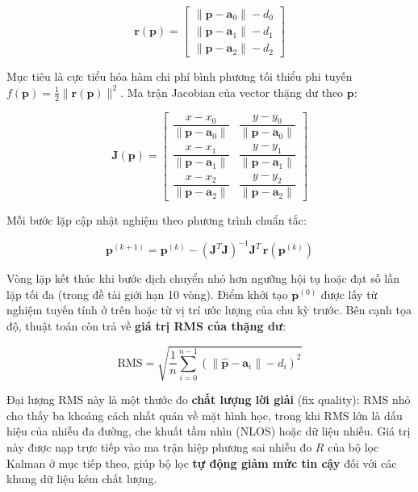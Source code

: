 \begin{equation}
    \mathbf{r}(\mathbf{p}) =
    \begin{bmatrix}
        \lVert \mathbf{p} - \mathbf{a}_0 \rVert - d_0 \\
        \lVert \mathbf{p} - \mathbf{a}_1 \rVert - d_1 \\
        \lVert \mathbf{p} - \mathbf{a}_2 \rVert - d_2
    \end{bmatrix}
\end{equation}

Mục tiêu là cực tiểu hóa hàm chi phí bình phương tối thiểu phi tuyến $f(\mathbf{p}) = \tfrac{1}{2} \lVert \mathbf{r}(\mathbf{p}) \rVert^2$. Ma trận Jacobian của vector thặng dư theo $\mathbf{p}$:

\begin{equation}
    \mathbf{J}(\mathbf{p}) =
    \begin{bmatrix}
        \dfrac{x - x_0}{\lVert \mathbf{p} - \mathbf{a}_0 \rVert} & \dfrac{y - y_0}{\lVert \mathbf{p} - \mathbf{a}_0 \rVert} \\[1.2em]
        \dfrac{x - x_1}{\lVert \mathbf{p} - \mathbf{a}_1 \rVert} & \dfrac{y - y_1}{\lVert \mathbf{p} - \mathbf{a}_1 \rVert} \\[1.2em]
        \dfrac{x - x_2}{\lVert \mathbf{p} - \mathbf{a}_2 \rVert} & \dfrac{y - y_2}{\lVert \mathbf{p} - \mathbf{a}_2 \rVert}
    \end{bmatrix}
\end{equation}

Mỗi bước lặp cập nhật nghiệm theo phương trình chuẩn tắc:

\begin{equation}
    \mathbf{p}^{(k+1)} = \mathbf{p}^{(k)} - \left(\mathbf{J}^T \mathbf{J}\right)^{-1} \mathbf{J}^T\, \mathbf{r}(\mathbf{p}^{(k)})
\end{equation}

Vòng lặp kết thúc khi bước dịch chuyển nhỏ hơn ngưỡng hội tụ hoặc đạt số lần lặp tối đa (trong đề tài giới hạn 10 vòng). Điểm khởi tạo $\mathbf{p}^{(0)}$ được lấy từ nghiệm tuyến tính ở trên hoặc từ vị trí ước lượng của chu kỳ trước. Bên cạnh tọa độ, thuật toán còn trả về \textbf{giá trị RMS của thặng dư}:

\begin{equation}
    \text{RMS} = \sqrt{\frac{1}{n}\sum_{i=0}^{n-1} \left(\lVert \hat{\mathbf{p}} - \mathbf{a}_i \rVert - d_i\right)^2}
\end{equation}

Đại lượng RMS này là một thước đo \textbf{chất lượng lời giải} (fix quality): RMS nhỏ cho thấy ba khoảng cách nhất quán về mặt hình học, trong khi RMS lớn là dấu hiệu của nhiễu đa đường, che khuất tầm nhìn (NLOS) hoặc dữ liệu nhiễu. Giá trị này được nạp trực tiếp vào ma trận hiệp phương sai nhiễu đo $R$ của bộ lọc Kalman ở mục tiếp theo, giúp bộ lọc \textbf{tự động giảm mức tin cậy} đối với các khung dữ liệu kém chất lượng.

